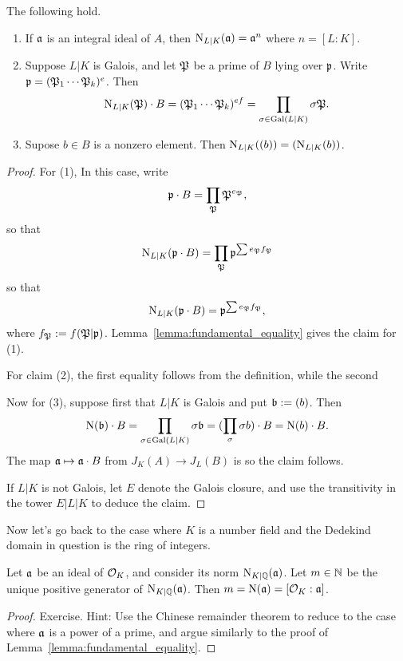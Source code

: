\begin{lemma}
  The following hold.
  \begin{enumerate}
    \item If $\mathfrak{a}$ is an integral ideal of $A$, then $\operatorname{N}_{L|K}(\mathfrak{a}) = \mathfrak{a}^n$ where $n = [L:K]$.
    \item Suppose $L|K$ is Galois, and let $\mathfrak{P}$ be a prime of $B$ lying over $\mathfrak{p}$.
          Write $\mathfrak{p} = (\mathfrak{P}_{1} \cdots \mathfrak{P}_{k})^{e}$.
          Then
          \[ \operatorname{N}_{L|K}(\mathfrak{P}) \cdot B = (\mathfrak{P}_{1} \cdots \mathfrak{P}_{k})^{ef} = \prod_{\sigma \in \operatorname{Gal}(L|K)} \sigma \mathfrak{P}. \]
    \item Supose $b \in B$ is a nonzero element.
          Then $\operatorname{N}_{L|K}((b)) = (\operatorname{N}_{L|K}(b))$.
  \end{enumerate}
\end{lemma}
\begin{proof}
  For (1), 
  In this case, write
  \[ \mathfrak{p} \cdot B = \prod_{\mathfrak{P}}\mathfrak{P}^{e_{\mathfrak{P}}}, \]
  so that
  \[ \operatorname{N}_{L|K}(\mathfrak{p} \cdot B) = \prod_{\mathfrak{P}} \mathfrak{p}^{\sum e_{\mathfrak{P}} f_{\mathfrak{P}}}\]
  so that
  \[ \operatorname{N}_{L|K}(\mathfrak{p} \cdot B) = \mathfrak{p}^{\sum e_{\mathfrak{P}} f_{\mathfrak{P}}},\]
  where $f_{\mathfrak{P}} := f(\mathfrak{P}|\mathfrak{p})$.
  Lemma~\ref{lemma:fundamental_equality} gives the claim for (1).

  For claim (2), the first equality follows from the definition, while the second 

  Now for (3), suppose first that $L|K$ is Galois and put $\mathfrak{b} := (b)$.
  Then
  \[ \operatorname{N}(\mathfrak{b}) \cdot B = \prod_{\sigma \in \operatorname{Gal}(L|K)} \sigma \mathfrak{b} = (\prod_{\sigma} \sigma b) \cdot B = \operatorname{N}(b) \cdot B. \]
  The map $\mathfrak{a} \mapsto \mathfrak{a} \cdot B$ from $J_{K}(A) \to J_{L}(B)$ is  so the claim follows.

  If $L|K$ is not Galois, let $E$ denote the Galois closure, and use the transitivity in the tower $E|L|K$ to deduce the claim.
\end{proof}

Now let's go back to the case where $K$ is a number field and the Dedekind domain in question is the ring of integers.
\begin{lemma}
  Let $\mathfrak{a}$ be an ideal of $\mathcal{O}_{K}$, and consider its norm $\operatorname{N}_{K|\mathbb{Q}}(\mathfrak{a})$.
  Let $m \in \mathbb{N}$ be the unique positive generator of $\operatorname{N}_{K|\mathbb{Q}}(\mathfrak{a})$.
  Then $m = \operatorname{N}(\mathfrak{a}) = [\mathcal{O}_{K}:\mathfrak{a}]$.
\end{lemma}
\begin{proof}
  Exercise.
  Hint: Use the Chinese remainder theorem to reduce to the case where $\mathfrak{a}$ is a power of a prime, and argue similarly to the proof of Lemma~\ref{lemma:fundamental_equality}.
\end{proof}

